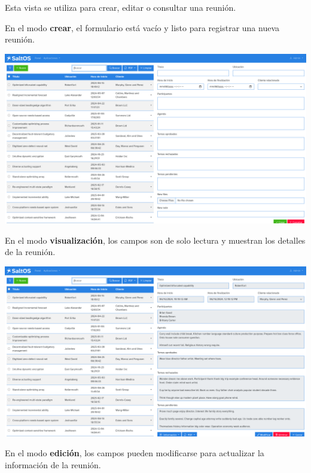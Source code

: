 \documentclass[a4paper]{article}
\begin{document}
Esta vista se utiliza para crear, editar o consultar una reunión.

En el modo \textbf{crear}, el formulario está vacío y listo para registrar una nueva reunión.

\begin{center}\includegraphics[width=1\textwidth]{../ujest/snaps/test-screenshots-js-screenshots-crm-meetings-create-es-es-1-snap.png}\end{center}

En el modo \textbf{visualización}, los campos son de solo lectura y muestran los detalles de la reunión.

\begin{center}\includegraphics[width=1\textwidth]{../ujest/snaps/test-screenshots-js-screenshots-crm-meetings-view-100-es-es-1-snap.png}\end{center}

En el modo \textbf{edición}, los campos pueden modificarse para actualizar la información de la reunión.
\end{document}
